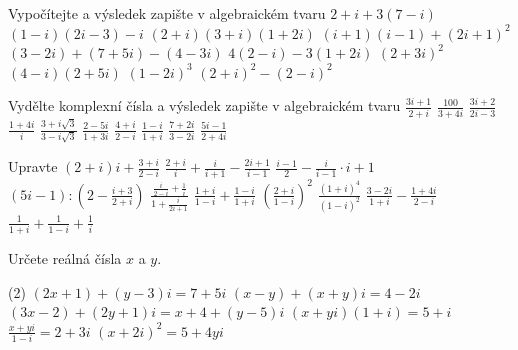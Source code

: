 
\exercisepart



\begin{exerciseblock}[2]{Vypočítejte a výsledek zapište v algebraickém tvaru}
    \task $2+i+3(7-i)$
    \task $(1-i)(2i-3)-i$
    \task $(2+i)(3+i)(1+2i)$
    \task $(i+1)(i-1)+(2i+1)^2$
    \task $(3-2i)+(7+5i)-(4-3i)$
    \task $4(2-i)-3(1+2i)$
    \task $(2+3i)^2$
    \task $(4-i)(2+5i)$
    \task $(1-2i)^3$
    \task $(2+i)^2-(2-i)^2$
\end{exerciseblock}


\begin{exerciseblock}[2]{Vydělte komplexní čísla a výsledek zapište v algebraickém tvaru}
    \task $\displaystyle \frac{3i+1}{2+i}$
    \task $\displaystyle \frac{100}{3+4i}$
    \task $\displaystyle \frac{3i+2}{2i-3}$
    \task $\displaystyle \frac{1+4i}{i}$
    \task $\displaystyle \frac{3+i\sqrt{3}}{3-i\sqrt{3}}$
    \task $\displaystyle \frac{2-5i}{1+3i}$
    \task $\displaystyle \frac{4+i}{2-i}$
    \task $\displaystyle \frac{1-i}{1+i}$
    \task $\displaystyle \frac{7+2i}{3-2i}$
    \task $\displaystyle \frac{5i-1}{2+4i}$
\end{exerciseblock}


\begin{exerciseblock}[2]{Upravte}
    \task $\displaystyle (2+i)i+\frac{3+i}{2-i}$
    \task $\displaystyle \frac{2+i}{i}+\frac{i}{i+1}-\frac{2i+1}{i-1}$
    \task $\displaystyle \frac{i-1}{2}-\frac{i}{i-1}\cdot i+1$
    \task $\displaystyle (5i-1):\left(2-\frac{i+3}{2+i}\right)$
    \task $\displaystyle \frac{\frac{i}{2-i}+\frac1i}{1+\frac{i}{2i+1}}$
    \task $\displaystyle \frac{1+i}{1-i}+\frac{1-i}{1+i}$
    \task $\displaystyle \left(\frac{2+i}{1-i}\right)^2$
    \task $\displaystyle \frac{(1+i)^4}{(1-i)^2}$
    \task $\displaystyle \frac{3-2i}{1+i}-\frac{1+4i}{2-i}$
    \task $\displaystyle \frac{1}{1+i}+\frac{1}{1-i}+\frac{1}{i}$
\end{exerciseblock}


\begin{exercise}{Určete reálná čísla $x$ a $y$.}
    \begin{tasks}(2)
        \task $(2x+1)+(y-3)i=7+5i$
        \task $(x-y)+(x+y)i=4-2i$
        \task $(3x-2)+(2y+1)i=x+4+(y-5)i$
        \task $(x+yi)(1+i)=5+i$
        \task $\displaystyle \frac{x+yi}{1-i}=2+3i$
        \task $(x+2i)^2=5+4yi$
    \end{tasks}
\end{exercise}


